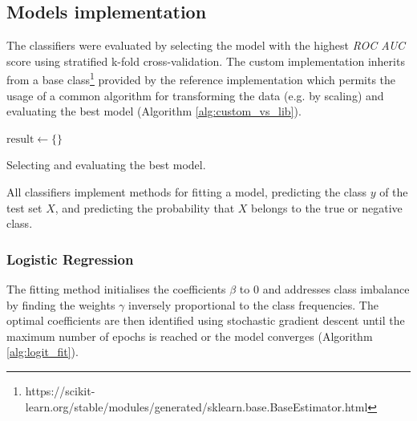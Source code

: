 \documentclass{article}[paper=a4,pagesize=auto,10pt]
\begin{document}
\subsection{Models implementation} \label{Models implementation}

The classifiers were evaluated by selecting the model with the highest \textit{ROC AUC} score using stratified k-fold cross-validation. The custom implementation inherits from a base class\footnote{https://scikit-learn.org/stable/modules/generated/sklearn.base.BaseEstimator.html} provided by the reference implementation which permits the usage of a common algorithm for transforming the data (e.g. by scaling) and evaluating the best model (Algorithm \ref{alg:custom_vs_lib}).\medskip

\begin{algorithm}[]
 $\textrm{result} \gets \{\}$\;
 \caption{Selecting and evaluating the best model.}
 \label{alg:custom_vs_lib}
\end{algorithm}\smallskip

All classifiers implement methods for fitting a model, predicting the class $y$ of the test set $X$, and predicting the probability that $X$ belongs to the true or negative class.

\subsubsection{Logistic Regression} \label{Logistic Regression}

The fitting method initialises the coefficients $\beta$ to 0 and addresses class imbalance by finding the weights $\gamma$ inversely proportional to the class frequencies. The optimal coefficients are then identified using stochastic gradient descent until the maximum number of epochs is reached or the model converges (Algorithm \ref{alg:logit_fit}).\medskip
\end{document}

